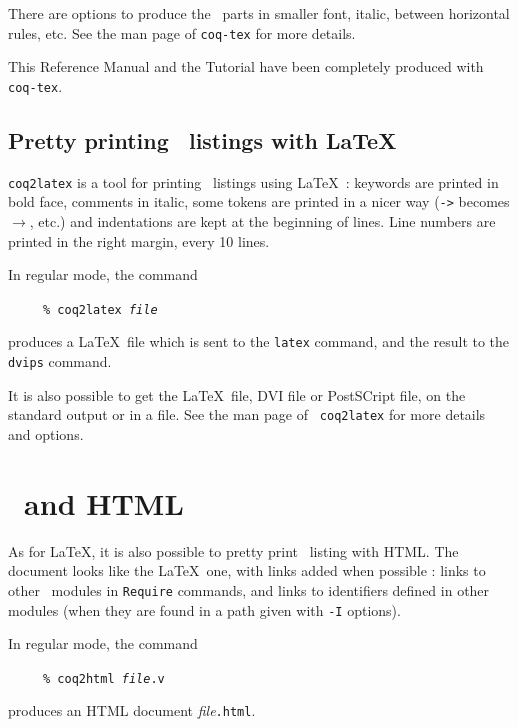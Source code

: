 There are options to produce the \Coq\ parts in smaller font, italic,
between horizontal rules, etc.
See the man page of {\tt coq-tex} for more details.

\medskip{} This Reference Manual and the Tutorial
have been completely produced with {\tt coq-tex}.


\subsection{Pretty printing \Coq\ listings with \LaTeX}

\verb!coq2latex! is a tool for printing \Coq\ listings using \LaTeX\ : 
keywords are printed in bold face, comments in italic, some tokens
are printed in a nicer way (\verb!->! becomes $\rightarrow$, etc.)
and indentations are kept at the beginning of lines.
Line numbers are printed in the right margin, every 10 lines.

In regular mode, the command 

\begin{flushleft}
~~~~~\texttt{\% coq2latex {\rm\em file}}
\end{flushleft}

\noindent produces a \LaTeX\ file which is sent to the \verb!latex! command,
and the result to the \verb!dvips! command. 

It is also possible to  get the \LaTeX\  file, DVI file or  PostSCript
file,  on the standard output or  in a file.  See the man page of {\tt
coq2latex} for more details and options.


\section{\Coq\ and HTML}\label{Html}

As for \LaTeX, it is also possible to pretty print \Coq\ listing with
HTML. The document looks like the \LaTeX\ one, with links added when
possible : links to other \Coq\ modules in {\tt Require} commands, and
links to identifiers defined in other modules (when they are found in a
path given with {\tt -I} options).

In regular mode, the command 

\begin{flushleft}
~~~~~\texttt{\% coq2html {\rm\em file}.v}
\end{flushleft}

\noindent produces an HTML document {{\em file}{\tt .html}}.

